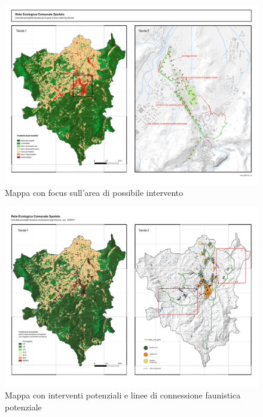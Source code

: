 \documentclass[
]{book}
\begin{document}
\begin{figure}

{\centering \includegraphics[width=\linewidth]{./figs/agendaUrbana/tavolaAgendaUrbana_BiopermInterventi20241218} 

}

\caption{Mappa con focus sull'area di possibile intervento}\label{fig:agUbioperm}
\end{figure}

\begin{figure}

{\centering \includegraphics[width=\linewidth]{./figs/agendaUrbana/tavolaAgendaUrbana20240731} 

}

\caption{Mappa con interventi potenziali e linee di connessione faunistica potenziale}\label{fig:agUintev}
\end{figure}
\end{document}
